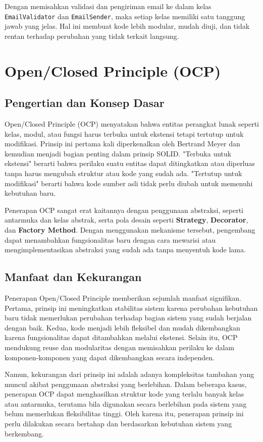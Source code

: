 Dengan memisahkan validasi dan pengiriman email ke dalam kelas \texttt{EmailValidator} dan \texttt{EmailSender}, maka setiap kelas memiliki satu tanggung jawab yang jelas. Hal ini membuat kode lebih modular, mudah diuji, dan tidak rentan terhadap perubahan yang tidak terkait langsung.

\section{Open/Closed Principle (OCP)}

\subsection{Pengertian dan Konsep Dasar}
Open/Closed Principle (OCP) menyatakan bahwa entitas perangkat lunak seperti kelas, modul, atau fungsi harus terbuka untuk ekstensi tetapi tertutup untuk modifikasi. Prinsip ini pertama kali diperkenalkan oleh Bertrand Meyer dan kemudian menjadi bagian penting dalam prinsip SOLID. "Terbuka untuk ekstensi" berarti bahwa perilaku suatu entitas dapat ditingkatkan atau diperluas tanpa harus mengubah struktur atau kode yang sudah ada. "Tertutup untuk modifikasi" berarti bahwa kode sumber asli tidak perlu diubah untuk memenuhi kebutuhan baru.

Penerapan OCP sangat erat kaitannya dengan penggunaan abstraksi, seperti antarmuka dan kelas abstrak, serta pola desain seperti \textbf{Strategy}, \textbf{Decorator}, dan \textbf{Factory Method}. Dengan menggunakan mekanisme tersebut, pengembang dapat menambahkan fungsionalitas baru dengan cara mewarisi atau mengimplementasikan abstraksi yang sudah ada tanpa menyentuh kode lama.

\subsection{Manfaat dan Kekurangan}
Penerapan Open/Closed Principle memberikan sejumlah manfaat signifikan. Pertama, prinsip ini meningkatkan stabilitas sistem karena perubahan kebutuhan baru tidak memerlukan perubahan terhadap bagian sistem yang sudah berjalan dengan baik. Kedua, kode menjadi lebih fleksibel dan mudah dikembangkan karena fungsionalitas dapat ditambahkan melalui ekstensi. Selain itu, OCP mendukung reuse dan modularitas dengan memisahkan perilaku ke dalam komponen-komponen yang dapat dikembangkan secara independen.

Namun, kekurangan dari prinsip ini adalah adanya kompleksitas tambahan yang muncul akibat penggunaan abstraksi yang berlebihan. Dalam beberapa kasus, penerapan OCP dapat menghasilkan struktur kode yang terlalu banyak kelas atau antarmuka, terutama bila digunakan secara berlebihan pada sistem yang belum memerlukan fleksibilitas tinggi. Oleh karena itu, penerapan prinsip ini perlu dilakukan secara bertahap dan berdasarkan kebutuhan sistem yang berkembang.

